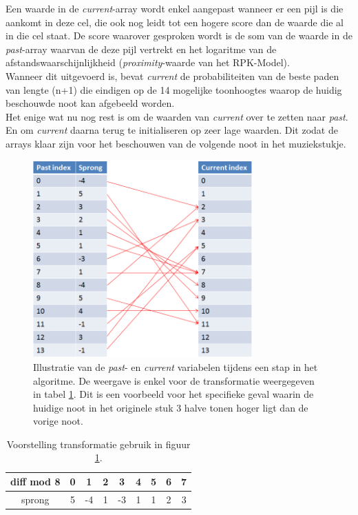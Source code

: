 Een waarde in de \textit{current}-array wordt enkel aangepast wanneer er een pijl is die aankomt in deze cel, die ook nog leidt tot een hogere score dan de waarde die al in die cel staat. De score waarover gesproken wordt is de som van de waarde in de \textit{past}-array waarvan de deze pijl vertrekt en het logaritme van de afstandswaarschijnlijkheid (\textit{proximity}-waarde van het RPK-Model).\\
Wanneer dit uitgevoerd is, bevat \textit{current} de probabiliteiten van de beste paden van lengte (n+1) die eindigen op de 14 mogelijke toonhoogtes waarop de huidig beschouwde noot kan afgebeeld worden.\\
Het enige wat nu nog rest is om de waarden van \textit{current} over te zetten naar \textit{past}. En om \textit{current} daarna terug te initialiseren op zeer lage waarden. Dit zodat de arrays klaar zijn voor het beschouwen van de volgende noot in het muziekstukje. 

\begin{figure}[!ht]
  \centering
  \includegraphics[width=0.75\textwidth]{4_Efficient_Toepassen_Transformatie/stap_algo_1}
  \caption{Illustratie van de \textit{past}- en \textit{current} variabelen tijdens een stap in het algoritme. De weergave is enkel voor de transformatie weergegeven in tabel \ref{tabel:transformatie}. Dit is een voorbeeld voor het specifieke geval waarin de huidige noot in het originele stuk 3 halve tonen hoger ligt dan de vorige noot.}
  \label{figuur:stap_algo_1}
\end{figure}

\begin{table}
  \centering
  \begin{tabular}{c | c  c  c  c  c  c  c  c }
    diff mod 8 & 0 & 1 & 2 & 3 & 4 & 5 & 6 & 7 \\
    \hline
    sprong & 5 & -4 & 1 & -3 & 1 & 1 & 2 & 3 \\
  \end{tabular}
  \caption{Voorstelling transformatie gebruik in figuur \ref{figuur:stap_algo_1}.}
  \label{tabel:transformatie}
\end{table}

